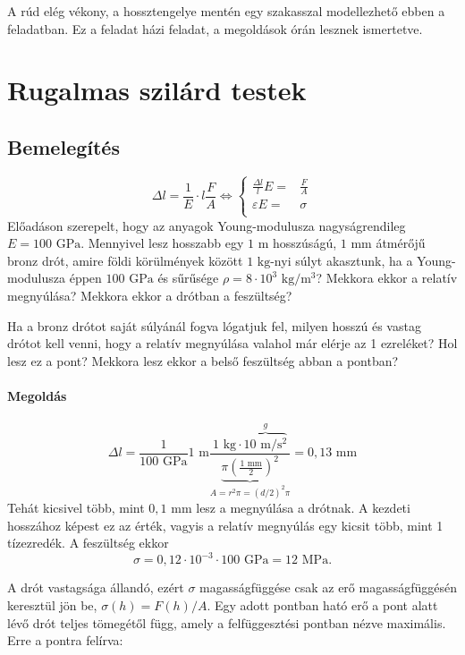 \documentclass[12pt,a4paper]{scrartcl}
\begin{document}
A rúd elég vékony, a hossztengelye mentén egy szakasszal modellezhető ebben a feladatban. Ez a feladat házi feladat, a megoldások órán lesznek ismertetve.

\section{Rugalmas szilárd testek}
\subsection{Bemelegítés}
\[\Delta l = \frac{1}{E} \cdot l\frac{F}{A} \Leftrightarrow \left\{ \begin{aligned}
  \frac{{\Delta l}}{l}E =  & \frac{F}{A} \\ 
  \varepsilon E =  & \sigma  \\ 
\end{aligned}  \right.\]
Előadáson szerepelt, hogy az anyagok Young-modulusza nagyságrendileg $E = 100{\text{ GPa}}$. Mennyivel lesz hosszabb egy $1{\text{ m}}$ hosszúságú, $1{\text{ mm}}$ átmérőjű bronz drót, amire földi körülmények között $1{\text{ kg}}$-nyi súlyt akasztunk, ha a Young-modulusza éppen $100{\text{ GPa}}$ és sűrűsége $\rho  = 8 \cdot {10^3}{\text{ kg/}}{{\text{m}}^{\text{3}}}$? Mekkora ekkor a relatív megnyúlása? Mekkora ekkor a drótban a feszültség? 

Ha a bronz drótot saját súlyánál fogva lógatjuk fel, milyen hosszú és vastag drótot kell venni, hogy a relatív megnyúlása valahol már elérje az 1 ezreléket? Hol lesz ez a pont? Mekkora lesz ekkor a belső feszültség abban a pontban?

\paragraph{Megoldás}
\[\Delta l = \frac{1}{{100{\text{ GPa}}}}1{\text{ m}}\frac{{1{\text{ kg}} \cdot \overbrace {10{\text{ m}}/{{\text{s}}^2}}^g}}{{\underbrace {\pi {{\left( {\frac{{1{\text{ mm}}}}{2}} \right)}^2}}_{A = {r^2}\pi  = {{\left( {d/2} \right)}^2}\pi }}} = 0{,}13{\text{ mm}}\]
Tehát kicsivel több, mint $0,1\text{ mm}$ lesz a megnyúlása a drótnak. A kezdeti hosszához képest ez az érték, vagyis a relatív megnyúlás egy kicsit több, mint 1 tízezredék. A feszültség ekkor
\[\sigma  = 0,12 \cdot {10^{ - 3}} \cdot 100{\text{ GPa}} = 12{\text{ MPa}}.\]

A drót vastagsága állandó, ezért $\sigma $ magasságfüggése csak az erő magasságfüggésén keresztül jön be, $\sigma \left( h \right) = F\left( h \right)/A$. Egy adott pontban ható erő a pont alatt lévő drót teljes tömegétől függ, amely a felfüggesztési pontban nézve maximális. Erre a pontra felírva: 
\end{document}
